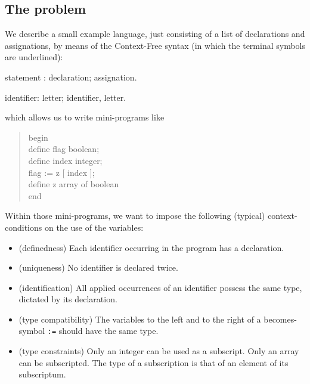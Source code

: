 \subsection{The problem}
We describe a small example language, just consisting
of a list of declarations and assignations, by means of the Context-Free
syntax (in which the terminal symbols are underlined):
\newcommand{\und}[1]{\underline{\rule[-.1cm]{0cm}{.1cm}#1}}
\begin{elan}
statement : 
   declaration; assignation.
\end{elan}
\begin{elan}
identifier: letter; identifier, letter.
\end{elan}
which allows us to write mini-programs like
{\sc \begin{quote}
begin\\
\makebox[.5cm]{}define flag boolean;\\
\makebox[.5cm]{}define index integer;\\
\makebox[.5cm]{}flag := z [ index ];\\
\makebox[.5cm]{}define z array of boolean\\
end
\end{quote}}
\noindent
Within those mini-programs,
we want to impose the following (typical) context-conditions on the use
of the variables:
\begin{itemize}
\item (definedness)
Each identifier occurring in the program has a declaration.
\item (uniqueness)
No identifier is declared twice.
\item (identification)
All applied occurrences of an identifier possess the same type, dictated
by its declaration.
\item (type compatibility)
The variables to the left and to the right of a becomes-symbol {\tt :=}
should have the same type.
\item (type constraints)
Only an integer can be used as a subscript. Only an array can be subscripted.
The type of a subscription is that of an element of its subscriptum.
\end{itemize}

